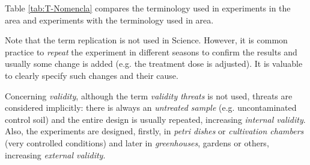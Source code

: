 


Table \ref{tab:T-Nomencla} compares the terminology used in experiments in the \Science area and \Automatic experiments with the terminology used in \SE area.

Note that the term replication is not used in Science. However, it is common practice to \emph{repeat} the experiment in different seasons to confirm the results and usually some change is added (e.g. the treatment dose is adjusted). It is valuable to clearly specify such changes and their cause.

Concerning \emph{validity}, although the term \emph{validity threats} is not used, threats are considered implicitly: there is always an \emph{untreated sample} (e.g. uncontaminated control soil) and the entire design is usually repeated, increasing \emph{internal validity}.  Also, the experiments are designed, firstly, in \emph{petri dishes} or \emph{cultivation chambers} (very controlled conditions) and later in \emph{greenhouses},  gardens  or others, increasing \emph{external validity}.




